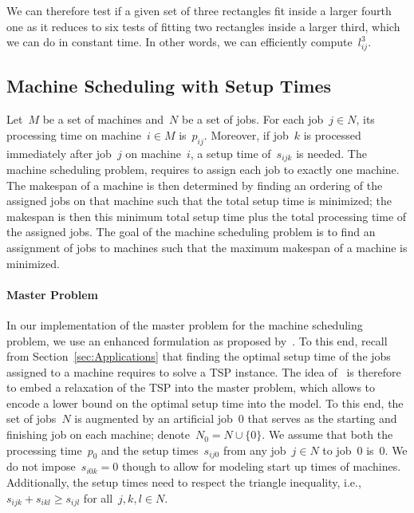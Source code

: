 \documentclass[a4paper,10pt]{article}
\newcommand{\lift}{l}
\theoremstyle{definition}
\begin{document}
%
We can therefore test if a given set of three rectangles fit inside a larger fourth one as it reduces to six tests of fitting two rectangles inside a larger third, which we can do in constant time.
In other words, we can efficiently compute~$\lift^3_{ij}$.

\subsection{Machine Scheduling with Setup Times}\label{app:MS}

Let~$M$ be a set of machines and~$N$ be a set of jobs.
For each job~$j \in N$, its processing time on machine~$i \in M$ is~$p_{ij}$.
Moreover, if job~$k$ is processed immediately after job~$j$ on machine~$i$, a setup time of~$s_{ijk}$ is needed.
The machine scheduling problem, requires to assign each job to exactly one machine.
The makespan of a machine is then determined by finding an ordering of the assigned jobs on that machine such that the total setup time is minimized; the makespan is then this minimum total setup time plus the total processing time of the assigned jobs.
The goal of the machine scheduling problem is to find an assignment of jobs to machines such that the maximum makespan of a machine is minimized.

\paragraph{Master Problem}
In our implementation of the master problem for the machine scheduling problem, we use an enhanced formulation as proposed by~\cite{tran2016decomposition}.
To this end, recall from Section~\ref{sec:Applications} that finding the optimal setup time of the jobs assigned to a machine requires to solve a TSP instance.
The idea of~\cite{tran2016decomposition} is therefore to embed a relaxation of the TSP into the master problem, which allows to encode a lower bound on the optimal setup time into the model.
To this end, the set of jobs~$N$ is augmented by an artificial job~$0$ that serves as the starting and finishing job on each machine;
denote~$N_0 = N \cup \{0\}$. We assume that both the processing time~$p_0$ and the setup times~$s_{ij0}$ from any job~$j \in N$ to job~$0$ is~0.
We do not impose~$s_{i0k} = 0$ though to allow for modeling start up times of machines.
Additionally, the setup times need to respect the triangle inequality, i.e., $s_{ijk} + s_{ikl} \geq s_{ijl}$ for all~$j, k, l\in N$.
\end{document}
